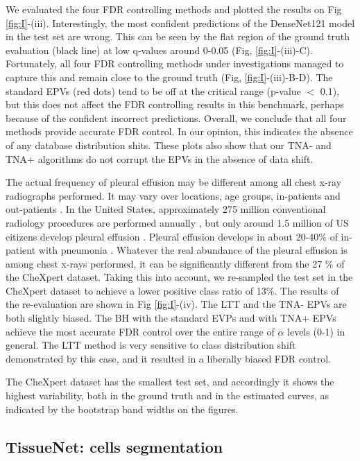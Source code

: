\documentclass[10pt,letterpaper]{article}
\begin{document}
We evaluated the four FDR controlling methods and plotted the results on Fig \ref{fig:I}-(iii).
Interestingly, the most confident predictions of the DenseNet121 model in the test set are wrong.
This can be seen by the flat region of the ground truth evaluation (black line) at low q-values around 0-0.05 (Fig, \ref{fig:I}-(iii)-C).
Fortunately, all four FDR controlling methods under investigations managed to capture this and remain close to the ground truth (Fig, \ref{fig:I}-(iii)-B-D).
The standard EPVs (red dots) tend to be off at the critical range (p-value $<$ 0.1), but this does not affect the FDR controlling results in this benchmark, perhaps because of the confident incorrect predictions.
Overall, we conclude that all four methods provide accurate FDR control.
In our opinion, this indicates the absence of any database distribution shits.
These plots also show that our TNA- and TNA+ algorithms do not corrupt  the EPVs in the absence of data shift.

The actual frequency of pleural effusion may be different among all chest x-ray radiographs performed.
It may vary over locations, age groups, in-patients and out-patients \cite{Zaki2024,Cashen2017PleuralEA}.
In the United States, approximately 275 million conventional radiology procedures are performed annually \cite{mahesh2022patient}, but only around 1.5 million of US citizens develop pleural effusion \cite{Cashen2017PleuralEA}.
Pleural effusion develops in about 20-40\% of in-patient with pneumonia \cite{shebl2018parapneumonic}.
Whatever the real abundance of the pleural effusion is among  chest x-rays performed, it can be significantly different from the 27 \% of the CheXpert dataset.
Taking this into account, we re-sampled the test set in the CheXpert dataset to achieve a lower positive class ratio of 13\%.
The results of the re-evaluation are shown in Fig \ref{fig:I}-(iv).
The LTT and the TNA- EPVs are both slightly biased.
The BH with the standard EVPs and with TNA+ EPVs achieve the most accurate FDR control over the entire range of $\alpha$ levels (0-1) in general.
The LTT method is very sensitive to class distribution shift demonstrated by this case, and it resulted in a liberally biased FDR control.

The CheXpert dataset has the smallest test set, and accordingly it shows the highest variability, both in the ground truth and in the estimated curves, as indicated by the bootstrap band widths on the figures.



\subsection*{TissueNet: cells segmentation}
\end{document}
